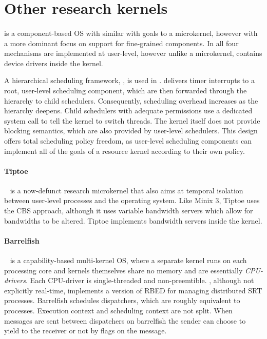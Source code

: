 \section{Other research kernels}

\paragraph{\composite} is a component-based \gls{OS} with similar with goals to a microkernel, however with a more dominant focus on support for fine-grained components.
In \composite all four mechanisms are implemented at user-level, however unlike a microkernel, \composite contains device drivers inside the kernel.

A hierarchical scheduling framework, \hires\citep{Parmer_West_11}, is used in \composite.
\hires delivers timer interrupts to a root, user-level scheduling component, which are then forwarded through the hierarchy to child schedulers.
Consequently, scheduling overhead increases as the hierarchy deepens.
Child schedulers with adequate permissions use a dedicated system call to tell the kernel to switch threads.
The kernel itself does not provide blocking semantics, which are also provided by user-level schedulers.
This design offers total scheduling policy freedom, as user-level scheduling components can implement all of the goals of a resource kernel according to their own policy.
 
\paragraph{Tiptoe}~\citep{Craciunas_KPRS_09} is a now-defunct research microkernel that also aims at temporal isolation between user-level processes and the operating system.
Like {\sc Minix 3}, Tiptoe uses the \gls{CBS} approach, although it uses variable bandwidth servers which allow for bandwidths to be altered.
Tiptoe implements bandwidth servers inside the kernel.

\paragraph{Barrelfish}~\citep{Peter_SBBIHR_10} is a capability-based multi-kernel \gls{OS}, where a separate kernel runs on each processing core and kernels themselves share no memory and are essentially \emph{\gls{CPU}-drivers}.
Each CPU-driver is single-threaded and non-preemtible. 
 , although not explicitly real-time, implements a version of \gls{RBED} for managing distributed \gls{SRT} processes.
Barrelfish schedules dispatchers, which are roughly equivalent to processes. 
Execution context and scheduling context are not split.
When messages are sent between dispatchers on barrelfish the sender can choose to yield to the receiver or not by flags on the message.

